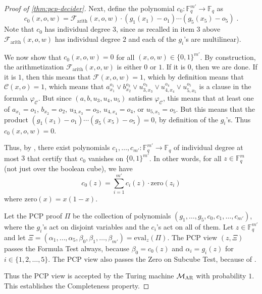 \documentclass[11pt]{article}
\theoremstyle{definition}
\newcommand{\F}{\ensuremath{\mathbb{F}}}
\newcommand{\gamestyle}[1]{\ensuremath{\textsc{#1}}\xspace}
\newcommand{\ar}{\gamestyle{AR}}
\newcommand{\eval}{\mathrm{eval}}
\newcommand{\circuit}{\mathcal{C}}
\newcommand{\formula}{\mathcal{F}}
\newcommand{\pcpverifier}{\mathcal{M}_\ar}
\begin{document}
\begin{proof}[Proof of \cref{thm:pcp-decider}]
Next, define the polynomial $c_0:\F_q^{m'} \rightarrow \F_q$ as
\begin{equation*}
  c_0(x, o, w) = \formula_{\mathrm{arith}} (x, o, w)
  \cdot (g_1(x_1) - o_1) \cdots (g_5(x_5)- o_5)\;.
\end{equation*}
Note that $c_0$ has individual degree $3$, since as recalled in item 3 above
$\formula_{\mathrm{arith}} (x, o, w)$ has individual degree $2$ and each of the
$g_i$'s are multilinear).
  
We now show that $c_0(x,o,w) = 0$ for all $(x,o,w) \in \{0,1\}^{m'}$.
By construction, the arithmetization $\formula_{\mathrm{arith}} (x, o, w)$ is
either $0$ or $1$.
If it is $0$, then we are done.
If it is $1$, then this means that $\formula(x,o,w) = 1$, which by definition
means that $\circuit(x,o) = 1$, which means that $a_{x_1}^{o_1} \lor
b_{x_2}^{o_2} \lor u_{3, x_3}^{o_3} \lor u_{4, x_4}^{o_4} \lor u_{5, x_5}^{o_5}$
is a clause in the formula $\varphi_\circuit$.
But since $(a,b,u_3,u_4,u_5)$ satisfies $\varphi_\circuit$, this means that at
least one of $a_{x_1} = o_1$, $b_{x_2} = o_2$, $u_{3,x_3} = o_3$, $u_{4,x_4} =
o_4$, or $u_{5,x_5} = o_5$.
But this means that the product $(g_1(x_1) - o_1) \cdots (g_5(x_5)- o_5) = 0$,
by definition of the $g_i$'s.
Thus $c_0(x,o,w) = 0$.
    
Thus, by , there exist polynomials $c_1,\ldots,c_{m'}:
\F_q^{m'} \to \F_q$ of individual degree at most $3$ that certify that $c_0$
vanishes on $\{0,1\}^{m'}$.
In other words, for all $z \in \F_q^m$ (not just over the boolean cube), we have
\begin{equation}
	\label{eq:restricted-to-subcube}
  c_0(z) = \sum_{i=1}^{m'} c_i(z) \cdot \mathrm{zero}(z_i)
\end{equation}
where $\mathrm{zero}(x) = x(1-x)$.
    
Let the PCP proof $\Pi$ be the collection of polynomials
$(g_1,\ldots,g_5,c_0,c_1,\ldots,c_{m'})$, where the $g_i$'s act on disjoint
variables and the $c_i$'s act on all of them.
Let $z \in \F_q^{m'}$ and let $\Xi =
(\alpha_1,\ldots,\alpha_5,\beta_0,\beta_1,\ldots,\beta_{m'}) = \eval_z(\Pi)$.
The PCP view $(z,\Xi)$ passes the Formula Test always, because $\beta_0 =
c_0(z)$ and $\alpha_i = g_i(z)$ for $i \in \{1,2,\ldots,5\}$.
The PCP view also passes the Zero on Subcube Test, because of
.
    
Thus the PCP view is accepted by the Turing machine $\pcpverifier$ with
probability $1$.
This establishes the Completeness property.
    

\end{proof}
\end{document}
